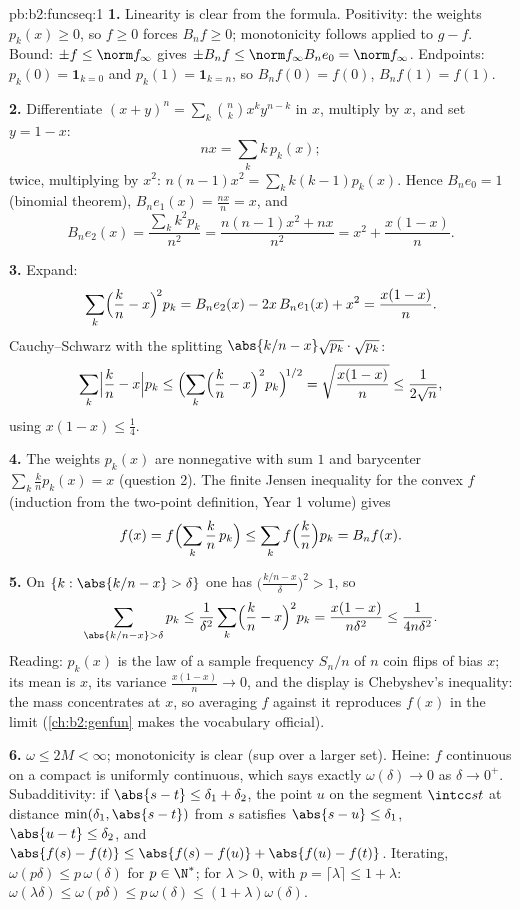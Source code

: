 \begin{solution}{pb:b2:funcseq:1}
\textbf{1.} Linearity is clear from the formula. Positivity:
the weights $p_k(x) \geq 0$, so $f \geq 0$ forces $B_nf \geq
0$; monotonicity follows applied to $g - f$. Bound: $\pm f \leq
\norm f_\infty$ gives $\pm B_nf \leq \norm f_\infty B_ne_0 =
\norm f_\infty$. Endpoints: $p_k(0) = \mathbf 1_{k=0}$ and
$p_k(1) = \mathbf 1_{k=n}$, so $B_nf(0) = f(0)$, $B_nf(1) =
f(1)$.

\textbf{2.} Differentiate $(x+y)^n = \sum_k\binom nk x^ky^{n-k}$
in $x$, multiply by $x$, and set $y = 1 - x$:
\[
nx = \sum_k k\,p_k(x) ;
\]
twice, multiplying by $x^2$: $n(n-1)x^2 = \sum_k k(k-1)p_k(x)$.
Hence $B_ne_0 = 1$ (binomial theorem), $B_ne_1(x) =
\frac{nx}{n} = x$, and
\[
B_ne_2(x) = \frac{\sum_k k^2p_k}{n^2}
= \frac{n(n-1)x^2 + nx}{n^2}
= x^2 + \frac{x(1-x)}{n} .
\]

\textbf{3.} Expand:
\[
\sum_k\Bigl(\frac kn - x\Bigr)^{\!2} p_k
= B_ne_2(x) - 2x\,B_ne_1(x) + x^2
= \frac{x(1-x)}{n} .
\]
Cauchy--Schwarz with the splitting $\abs{k/n - x}\sqrt{p_k}
\cdot \sqrt{p_k}$:
\[
\sum_k\Bigl|\frac kn - x\Bigr| p_k
\leq \Bigl(\sum_k\Bigl(\frac kn - x\Bigr)^2
p_k\Bigr)^{\!1/2}
= \sqrt{\frac{x(1-x)}{n}} \leq \frac{1}{2\sqrt n},
\]
using $x(1-x) \leq \frac14$.

\textbf{4.} The weights $p_k(x)$ are nonnegative with sum $1$
and barycenter $\sum_k \frac kn p_k(x) = x$ (question 2). The
finite Jensen inequality for the convex $f$ (induction from the
two-point definition, Year 1 volume) gives
\[
f(x) = f\Bigl(\sum_k \frac kn\,p_k\Bigr)
\leq \sum_k f\Bigl(\frac kn\Bigr)p_k = B_nf(x) .
\]

\textbf{5.} On $\{k : \abs{k/n - x} > \delta\}$ one has
$\bigl(\frac{k/n - x}{\delta}\bigr)^2 > 1$, so
\[
\sum_{\abs{k/n-x}>\delta} p_k
\leq \frac{1}{\delta^2}\sum_k\Bigl(\frac kn -
x\Bigr)^2p_k
= \frac{x(1-x)}{n\delta^2} \leq \frac{1}{4n\delta^2} .
\]
Reading: $p_k(x)$ is the law of a sample frequency $S_n/n$ of
$n$ coin flips of bias $x$; its mean is $x$, its variance
$\frac{x(1-x)}n \to 0$, and the display is Chebyshev's
inequality: the mass concentrates at $x$, so averaging $f$
against it reproduces $f(x)$ in the limit
(\cref{ch:b2:genfun} makes the vocabulary official).

\textbf{6.} $\omega \leq 2M < \infty$; monotonicity is clear
(sup over a larger set). Heine: $f$ continuous on a compact is
uniformly continuous, which says exactly $\omega(\delta) \to 0$
as $\delta \to 0^+$. Subadditivity: if $\abs{s - t} \leq
\delta_1 + \delta_2$, the point $u$ on the segment $\intcc st$
at distance $\min(\delta_1, \abs{s-t})$ from $s$ satisfies
$\abs{s-u} \leq \delta_1$, $\abs{u-t} \leq \delta_2$, and
$\abs{f(s)-f(t)} \leq \abs{f(s)-f(u)} + \abs{f(u)-f(t)}$.
Iterating, $\omega(p\delta) \leq p\,\omega(\delta)$ for $p \in
\N^*$; for $\lambda > 0$, with $p = \lceil\lambda\rceil \leq 1
+ \lambda$: $\omega(\lambda\delta) \leq \omega(p\delta) \leq
p\,\omega(\delta) \leq (1+\lambda)\omega(\delta)$.


\end{solution}
